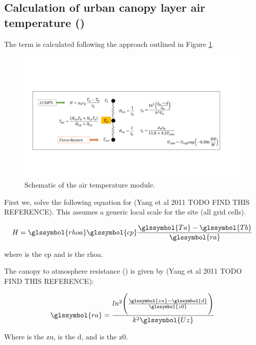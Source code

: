 \documentclass[final,3p,times,authoryear]{elsarticle}
\begin{document}
\subsection{Calculation of urban canopy layer air temperature () }\label{sec:calcTac}


The  term is calculated following the approach outlined in Figure \ref{fig:Tac}. 


\begin{figure}[!htbp]
\includegraphics[trim=13mm 43mm 32mm 55mm, clip,scale=0.60]{images/Tac.png}
 \caption{Schematic of the air temperature module.} \label{fig:Tac}
\end{figure}


First we, solve the following equation for  (Yang et al 2011 TODO FIND THIS REFERENCE). This assumes a generic local scale  for the site (all grid cells). 

\begin{equation} 
H = \glssymbol{rhoa} \glssymbol{cp} \frac{\glssymbol{Ta}-\glssymbol{Tb}}{\glssymbol{ra}}
\label{eq:H_air} \end{equation}

where  is the \glsdesc{cp} and  is the \glsdesc{rhoa}. 

The canopy to atmosphere resistance () is given by (Yang et al 2011 TODO FIND THIS REFERENCE):

\begin{equation} 
\glssymbol{ra} = \frac{ln^{2} \Bigg( \frac{\glssymbol{zu}-\glssymbol{d}}{\glssymbol{z0}}   \Bigg)   } {k^{2} \glssymbol{Uz}}
\label{eq:ra} \end{equation}

Where  is the \glsdesc{zu},  is the \glsdesc{d}, and  is the \glsdesc{z0}. 
\end{document}
